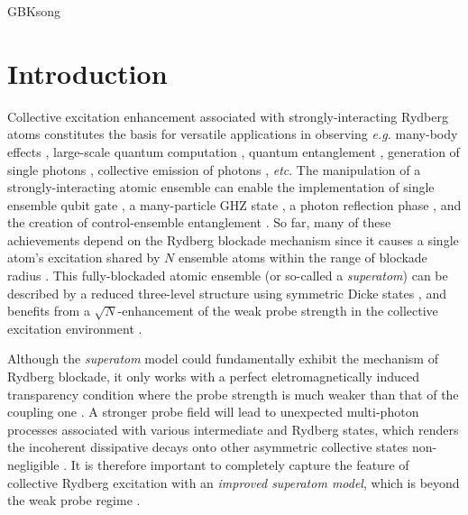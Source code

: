 \documentclass{cpbtex}
\begin{document}
\begin{CJK*}{GBK}{song}
\section{Introduction}
Collective excitation enhancement associated with strongly-interacting Rydberg atoms constitutes the basis for versatile applications in observing {\it e.g.} many-body effects \cite{PhysRevLett.114.203002,PhysRevA.96.041602,PhysRevLett.123.203603,PhysRevResearch.2.043339}, large-scale quantum computation \cite{PhysRevLett.99.260501,Zhang_2021,Wu_2021,Chinese Phys.B.29.083202}, quantum entanglement \cite{PhysRevA.98.043836,Yang2022,PhysRevLett.128.060502}, generation of single photons \cite{Yang:22,PhysRevResearch.3.033287}, collective emission of photons \cite{PhysRevA.103.023703}, {\it etc}.
The manipulation of a strongly-interacting atomic ensemble can enable the implementation of single ensemble qubit gate \cite{PhysRevA.102.042607}, a many-particle GHZ state \cite{PhysRevA.98.062326, PhysRevResearch.4.033087,RevModPhys.82.2313}, a photon reflection phase \cite{Motzoi_2018}, and the creation of control-ensemble entanglement \cite{PhysRevLett.102.170502}.
So far, many of these achievements depend on the Rydberg blockade mechanism since it causes a single atom's excitation shared by $N$ ensemble atoms within the range of blockade radius \cite{PhysRevLett.99.163601,PhysRevA.87.053414,PhysRevX.5.031015,PhysRevLett.128.123601}. This fully-blockaded atomic ensemble (or so-called a {\it superatom}) can be described by a reduced three-level structure using symmetric Dicke states \cite{PhysRevLett.107.213601}, and benefits from a $\sqrt{N}$-enhancement of the weak probe strength in the collective excitation environment \cite{Dudin2012,PhysRevA.87.023401,PhysRevA.97.043811}. 


Although the {\it superatom} model could fundamentally exhibit the mechanism of Rydberg blockade, it only works with a perfect eletromagnetically induced transparency condition where the probe strength is much weaker than that of the coupling one \cite{PhysRevLett.105.193603}. A stronger probe field will lead to unexpected multi-photon processes associated with various intermediate and Rydberg states, which renders the incoherent dissipative decays onto other asymmetric collective states non-negligible \cite{Qiao_2021,PhysRevA.105.043715}. It is therefore important to completely capture the feature of collective Rydberg excitation with an {\it improved superatom model}, which is beyond the weak probe regime \cite{PhysRevA.89.033839}.




\end{CJK*}
\end{document}
